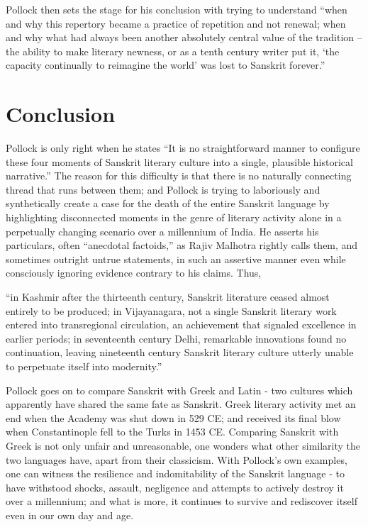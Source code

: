 Pollock then sets the stage for his conclusion with trying to understand “when and why this repertory became a practice of repetition and not renewal; when and why what had always been another absolutely central value of the tradition – the ability to make literary newness, or as a tenth century writer put it, ‘the capacity continually to reimagine the world’ was lost to Sanskrit forever.”

\section*{Conclusion}

Pollock is only right when he states “It is no straightforward manner to configure these four moments of Sanskrit literary culture into a single, plausible historical narrative.” The reason for this difficulty is that there is no naturally connecting thread that runs between them; and Pollock is trying to laboriously and synthetically create a case for the death of the entire Sanskrit language by highlighting disconnected moments in the genre of literary activity alone in a perpetually changing scenario over a millennium of India.  He asserts his particulars, often “anecdotal factoids,” as Rajiv Malhotra rightly calls them, and sometimes outright untrue statements, in such an assertive manner even while consciously ignoring evidence contrary to his claims. Thus, 

\begin{myquote}
“in Kashmir after the thirteenth century, Sanskrit literature ceased almost entirely to be produced; in Vijayanagara, not a single Sanskrit literary work entered into transregional circulation, an achievement that signaled excellence in earlier periods; in seventeenth century Delhi, remarkable innovations found no continuation, leaving nineteenth century Sanskrit literary culture utterly unable to perpetuate itself into modernity.” 
\end{myquote}

Pollock goes on to compare Sanskrit with Greek and Latin - two cultures which apparently have shared the same fate as Sanskrit.  Greek literary activity met an end when the Academy was shut down in 529 CE; and received its final blow when Constantinople fell to the Turks in 1453 CE. Comparing Sanskrit with Greek is not only unfair and unreasonable, one wonders what other similarity the two languages have, apart from their classicism. With Pollock’s own examples, one can witness the resilience and indomitability of the Sanskrit language - to have withstood shocks, assault, negligence and attempts to actively destroy it over a millennium; and what is more, it continues to survive and rediscover itself even in our own day and age.

